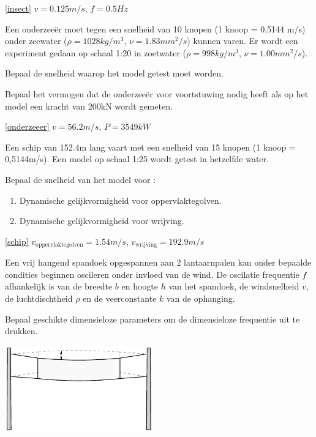 \begin{antwoord}{\ref{insect}}
	$v = 0.125\unit{m/s}$, $f = 0.5\unit{Hz}$
\end{antwoord}
\begin{toepassing}[*]
	\label{onderzeeer}	
Een onderzeeër moet tegen een snelheid van 10 knopen (1 knoop = 0,5144 m/s) onder zeewater ($\rho = 1028\unit{kg/m^3}$, $\nu = 1.83\unit{mm^2/s}$) kunnen varen. Er wordt een experiment gedaan op schaal 1:20 in zoetwater ($\rho = 998\unit{kg/m^3}$, $\nu = 1.00\unit{mm^2/s}$).
		
Bepaal de snelheid waarop het model getest moet worden.
		
Bepaal het vermogen dat de onderzeeër voor voortstuwing nodig heeft als op het model een kracht van 200\unit{kN} wordt gemeten.
\end{toepassing}
\begin{antwoord}{\ref{onderzeeer}}
	$v = 56.2\unit{m/s}$, $P = 3549\unit{kW}$
\end{antwoord}
\begin{toepassing}[*]
	\label{schip}
Een schip van 152.4\unit{m} lang vaart met een snelheid van 15 knopen (1 knoop = 0,5144m/s). Een model op schaal 1:25 wordt getest in hetzelfde water.

Bepaal de snelheid van het model voor :
	\begin{enumerate}
		\item Dynamische gelijkvormigheid voor oppervlaktegolven.
		\item Dynamische gelijkvormigheid voor wrijving.
	\end{enumerate}
\end{toepassing}
\begin{antwoord}{\ref{schip}}
	$v_{\text{oppervlaktegolven}} = 1.54\unit{m/s}$, $v_{\text{wrijving}} = 192.9\unit{m/s}$
\end{antwoord}
\begin{toepassing}
	\label{spandoek}
Een vrij hangend spandoek opgespannen aan 2 lantaarnpalen kan onder bepaalde condities beginnen oscileren onder invloed van de wind. De oscilatie frequentie $f$ afhankelijk is van de breedte $b$ en hoogte $h$ van het spandoek, de windsnelheid $v$, de luchtdischtheid $\rho$ en de veerconstante $k$ van de ophanging.

Bepaal geschikte dimensieloze parameters om de dimensieloze frequentie uit te drukken. 

	\centering
	\includegraphics[width=0.48\textwidth]{fig/gelijkvormigheid/spandoek.pdf}
\end{toepassing}
